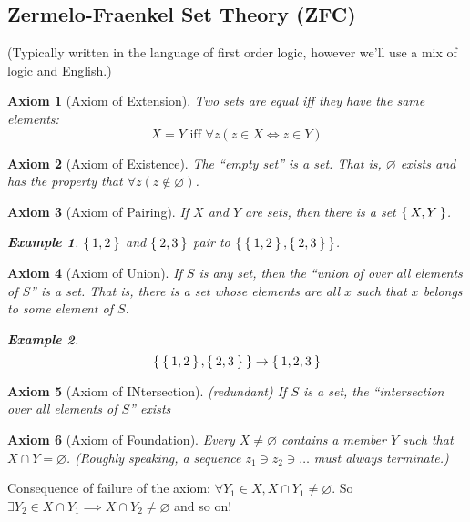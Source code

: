 \documentclass[12pt]{amsart}
\theoremstyle{plain}
\newtheorem{AXM}{Axiom}
\theoremstyle{remark}
\theoremstyle{definition}
\newtheorem*{eg}{Example}
\begin{document}
\subsection*{Zermelo-Fraenkel Set Theory (ZFC)} 
(Typically written in the language of first order logic, however we'll use a mix of logic and English.)

\begin{AXM}[Axiom of Extension]
	Two sets are equal iff they have the same elements:
\begin{equation*}
	X = Y \text{ iff } \forall z(z\in X \iff z\in Y) 
\end{equation*}
\end{AXM}

\begin{AXM}[Axiom of Existence]
	The ``empty set'' is a set. That is, $\varnothing$ exists and has the property that $\forall z(z \notin \varnothing)$.
\end{AXM}

\begin{AXM}[Axiom of Pairing]
	If $X$ and $Y$ are sets, then there is a set $\Set{X, Y}$.
	\begin{eg}
		$\Set{1, 2}$ and $\Set{2, 3}$ pair to $\Set{\Set{1,2}, \Set{2,3}}$.
	\end{eg}
\end{AXM}

\begin{AXM}[Axiom of Union]
	If $S$ is any set, then the ``union of over all elements of $S$'' is a set. That is, there is a set whose elements are all $x$ such that $x$ belongs to some element of $S$.
	\begin{eg}
	\begin{equation*}
		\Set{\Set{1,2},\Set{2,3}} \rightarrow \Set{1,2,3}
	\end{equation*}
	\end{eg}
\end{AXM}

\begin{AXM}[Axiom of INtersection](redundant)
	If $S$ is a set, the ``intersection over all elements of $S$'' exists
\end{AXM}

\begin{AXM}[Axiom of Foundation]
	Every $X \neq \varnothing$ contains a member $Y$ such that $X \cap Y = \varnothing$.
	(Roughly speaking, a sequence $z_1 \ni z_2 \ni \dots$ must always terminate.)
\end{AXM}
Consequence of failure of the axiom:
\newline
$\forall Y_1 \in X, X \cap Y_1 \neq \varnothing$. So $\exists Y_2\in X \cap Y_1 \implies X \cap Y_2 \neq \varnothing$ and so on!
\end{document}
